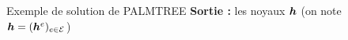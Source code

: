 \begin{frame}{Exemple de solution de PALMTREE}
\textbf{Sortie :} les noyaux $\bm{h}$ (on note $\bm{h} = (\bm{h}^e)_{e \in \mathcal E}$)
\begin{figure}\centering
{}
\end{figure}
\end{frame}


